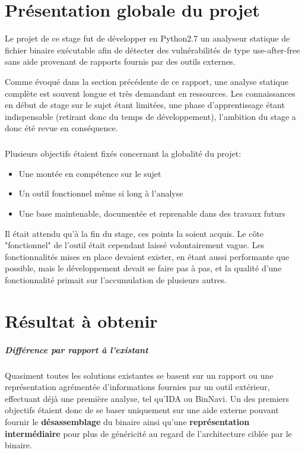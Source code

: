 \section{Présentation globale du projet}

Le projet de ce stage fut de développer en Python2.7 un analyseur statique de fichier
binaire exécutable afin de détecter des vulnérabilités de type use-after-free sans aide
provenant de rapports fournis par des outils externes.


Comme évoqué dans la section précédente de ce rapport, une analyse statique complète est souvent
longue et très demandant en ressources. Les connaissances en début de stage sur le sujet étant limitées,
une phase d'apprentissage étant indispensable (retirant donc du temps de développement), l'ambition du stage
a donc été revue en conséquence.
\subparagraph{}
Plusieurs objectifs étaient fixés concernant la globalité du projet:
\begin{itemize}
        \item Une montée en compétence sur le sujet
        \item Un outil fonctionnel même si long à l'analyse
        \item Une base maintenable, documentée et reprenable dans des travaux futurs
\end{itemize}

Il était attendu qu'à la fin du stage, ces points la soient acquis. Le côte "fonctionnel"
de l'outil était cependant laissé volontairement vague. Les fonctionnalités mises en place
devaient exister, en étant aussi performante que possible, mais le développement devait se faire
pas à pas, et la qualité d'une fonctionnalité primait sur l'accumulation de plusieurs autres.

\section{Résultat à obtenir}

\subparagraph{Différence par rapport à l'existant}

Quasiment toutes les solutions existantes se basent sur un rapport ou une représentation agrémentée d'informations fournies
par un outil extérieur, effectuant déjà une première analyse, tel qu'IDA ou BinNavi. Un des premiers objectifs étaient donc de
se baser uniquement sur une aide externe pouvant fournir le \textbf{désassemblage} du binaire ainsi qu'une \textbf{représentation intermédiaire}
pour plus de généricité au regard de l'architecture ciblée par le binaire.

